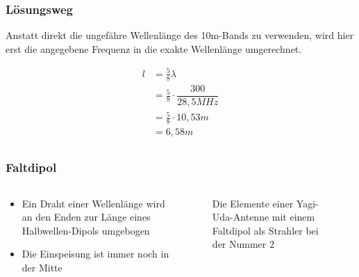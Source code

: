 \begin{frame}
\frametitle{Lösungsweg}
Anstatt direkt die ungefähre Wellenlänge des 10m-Bands zu verwenden, wird hier erst die angegebene Frequenz in die exakte Wellenlänge umgerechnet.

\begin{equation} \begin{split} l &= \frac{5}{8}\lambda\\ &= \frac{5}{8} \cdot \dfrac{300}{28,5MHz}\\ &= \frac{5}{8} \cdot 10,53m\\ &= 6,58m\\ \end{split} \end{equation}

\end{frame}

\begin{frame}
\frametitle{Faltdipol}
\begin{columns}
    \begin{column}{0.48\textwidth}
    \begin{itemize}
  \item Ein Draht einer Wellenlänge wird an den Enden zur Länge eines Halbwellen-Dipols umgebogen
  \item Die Einspeisung ist immer noch in der Mitte
  \end{itemize}

    \end{column}
   \begin{column}{0.48\textwidth}
       
\begin{figure}
    \caption{\scriptsize Die Elemente einer Yagi-Uda-Antenne mit einem Faltdipol als Strahler bei der Nummer 2}
    \label{e_antenne_laenge_resonanz}
\end{figure}


   \end{column}
\end{columns}

\end{frame}

\begin{frame}
\end{frame}%

